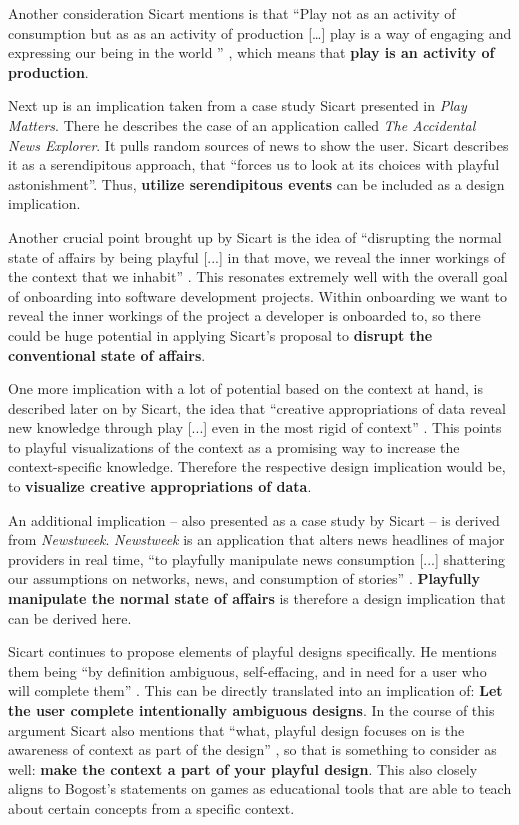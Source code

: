 Another consideration Sicart mentions is that \enquote{Play not as an activity of consumption but as as an activity of production […] play is a way of engaging and expressing our being in the world } \cite[p. 5]{sicart2014play}, which means that \textbf{play is an activity of production}.

Next up is an implication taken from a case study Sicart presented in \textit{Play Matters}. There he describes the case of an application called \textit{The Accidental News Explorer}. It pulls random sources of news to show the user. Sicart describes it as a serendipitous approach, that \enquote{forces us to look at its choices with playful astonishment}. Thus, \textbf{utilize serendipitous events} can be included as a design implication.

Another crucial point brought up by Sicart is the idea of \enquote{disrupting the normal state of affairs by being playful [...] in that move, we reveal the inner workings of the context that we inhabit} \cite[p. 15]{sicart2014play}. This resonates extremely well with the overall goal of onboarding into software development projects. Within onboarding we want to reveal the inner workings of the project a developer is onboarded to, so there could be huge potential in applying Sicart's proposal to \textbf{disrupt the conventional state of affairs}.

One more implication with a lot of potential based on the context at hand, is described later on by Sicart, the idea that \enquote{creative appropriations of data reveal new knowledge through play [...] even in the most rigid of context} \cite[p. 28]{sicart2014play}. This points to playful visualizations of the context as a promising way to increase the context-specific knowledge. Therefore the respective design implication would be, to \textbf{visualize creative appropriations of data}.

An additional implication -- also presented as a case study by Sicart -- is derived from \textit{Newstweek}. \textit{Newstweek} is an application that alters news headlines of major providers in real time, \enquote{to playfully manipulate news consumption [...] shattering our assumptions on networks, news, and consumption of stories} \cite[p. 29]{sicart2014play}. \textbf{Playfully manipulate the normal state of affairs} is therefore a design implication that can be derived here.

Sicart continues to propose elements of playful designs specifically. He mentions them being \enquote{by definition ambiguous, self-effacing, and in need for a user who will complete them} \cite[p. 31]{sicart2014play}. This can be directly translated into an implication of: \textbf{Let the user complete intentionally ambiguous designs}. In the course of this argument Sicart also mentions that \enquote{what, playful design focuses on is the awareness of context as part of the design} \cite[p. 29]{sicart2014play}, so that is something to consider as well: \textbf{make the context a part of your playful design}. This also closely aligns to Bogost's statements on games as educational tools that are able to teach about certain concepts from a specific context.

